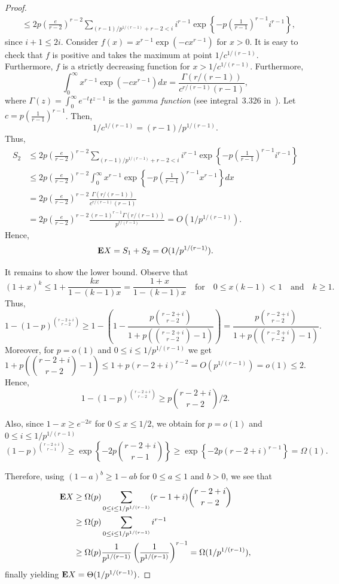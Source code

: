 \documentclass[12pt,reqno]{amsart}
\theoremstyle{remark}
\def\E{\mbox{{\bf E}}}
\def\E{\mbox{{\bf E}}}
\begin{document}
\begin{proof}
\begin{align*}
&\le 2p\left(\frac{e}{r-2}\right)^{r-2}\sum_{(r-1)/p^{1/(r-1)}+r-2<i} i^{r-1} \exp\left\{-p\left(\frac{1}{r-1}\right)^{r-1} i^{r-1}\right\},
\end{align*}
since $i+1\le 2i$.
Consider $f(x) = x^{r-1}\exp(-cx^{r-1})$ for $x> 0$. It is easy to check that $f$ is positive and  takes the maximum at point $1/c^{1/(r-1)}$. Furthermore, $f$ is a strictly decreasing function for $x> 1/c^{1/(r-1)}$. Furthermore,
\[
\int_0^\infty x^{r-1}\exp(-cx^{r-1}) dx= \frac{\Gamma(r/(r - 1))}{c^{r/(r-1)}(r - 1)},
\]
where $\Gamma(z)=\int_0^\infty e^{-t}t^{z-1}$ is the \emph{gamma function}
(see integral~3.326 in~\cite{tables}).
Let $c=p\left(\frac{1}{r-1}\right)^{r-1}$. Then, 
\[
1/c^{1/(r-1)} = (r-1)/p^{1/(r-1)}. %
\]
Thus,
\begin{align*}
S_2 &\le 2p\left(\frac{e}{r-2}\right)^{r-2}\sum_{(r-1)/p^{1/(r-1)}+r-2<i} i^{r-1} \exp\left\{-p\left(\frac{1}{r-1}\right)^{r-1} i^{r-1}\right\}\\
&\le 2p\left(\frac{e}{r-2}\right)^{r-2} \int_{0}^\infty x^{r-1} \exp\left\{-p\left(\frac{1}{r-1}\right)^{r-1} x^{r-1}\right\}dx\\
&= 2p\left(\frac{e}{r-2}\right)^{r-2} \frac{\Gamma(r/(r - 1))}{c^{r/(r-1)}(r - 1)}\\
&= 2p\left(\frac{e}{r-2}\right)^{r-2} \frac{(r - 1)^{r-1}\Gamma(r/(r - 1))}{p^{r/(r-1)}} = O(1/p^{1/(r-1)}).
\end{align*}
Hence, 
\[
\E X = S_1 + S_2 = O(1/p^{1/(r-1)}).
\]

It remains to show the lower bound. Observe that
\[
(1+x)^k\le 1+ \frac{kx}{1-(k-1)x} =\frac{1+x}{1-(k-1)x}\quad \text{for} \quad 0\leq x(k-1)<1 \quad \text{and}\quad k\ge 1.
\]
Thus,
\[
1-\left(1-p \right)^{\binom{r-2+i}{r-2}}
\ge 1-\left(1-\frac{p {\binom{r-2+i}{r-2}}}{1+p\left({\binom{r-2+i}{r-2}}-1\right)}\right) 
=\frac{p {\binom{r-2+i}{r-2}}}{1+ p\left({\binom{r-2+i}{r-2}}-1\right)}.
\]
Moreover, for $p=o(1)$ and $0\le i\le 1/p^{1/(r-1)}$ we get
\[
1+p\left({\binom{r-2+i}{r-2}}-1\right) \le 1+p(r-2+i)^{r-2} = O(p^{1/(r-1)}) = o(1) \le 2.
\]
Hence,
\[
1-\left(1-p \right)^{\binom{r-2+i}{r-2}} \ge p {\binom{r-2+i}{r-2}}/2.
\]

Also, since $1-x \ge e^{-2x}$ for $0\le x\le 1/2$, we obtain for $p=o(1)$ and $0\le i\le 1/p^{1/(r-1)}$
\[
(1-p)^{\binom{r-2+i}{r-1}} \ge \exp\left\{-2p \binom{r-2+i}{r-1} \right\}
\ge \exp\left\{-2p (r-2+i)^{r-1} \right\} = \Omega(1).
\] 

Therefore, using $(1-a)^b\geq 1-ab$ for $0\leq a\leq 1$ and $b>0$, we see that
\begin{align*}
\E X &\ge \Omega(p) \sum_{0\le i\le 1/p^{1/(r-1)}} (r-1+i)\binom{r-2+i}{r-2} \\
&\ge \Omega(p) \sum_{0\le i\le 1/p^{1/(r-1)}} i^{r-1}\\
&\ge \Omega(p) \frac{1}{p^{1/(r-1)}} \left( \frac{1}{p^{1/(r-1)}} \right)^{r-1} = \Omega(1/p^{1/(r-1)}),
\end{align*}
finally yielding $\E X = \Theta(1/p^{1/(r-1)})$.
\end{proof}
\end{document}
